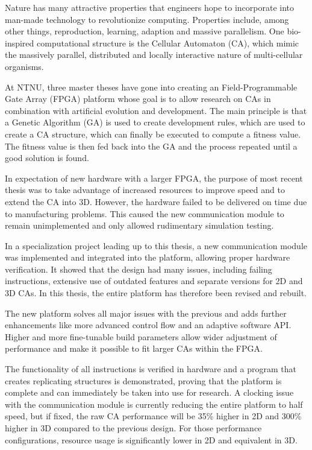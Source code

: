 Nature has many attractive properties that engineers hope to incorporate into man-made technology to revolutionize computing.
Properties include, among other things, reproduction, learning, adaption and massive parallelism.
One bio-inspired computational structure is the Cellular Automaton (CA), which mimic the massively parallel, distributed and locally interactive nature of multi-cellular organisms.

At NTNU, three master theses have gone into creating an Field-Programmable Gate Array (FPGA) platform whose goal is to allow research on CAs in combination with artificial evolution and development.
The main principle is that a Genetic Algorithm (GA) is used to create development rules, which are used to create a CA structure, which can finally be executed to compute a fitness value.
The fitness value is then fed back into the GA and the process repeated until a good solution is found.

In expectation of new hardware with a larger FPGA, the purpose of most recent thesis was to take advantage of increased resources to improve speed and to extend the CA into 3D.
However, the hardware failed to be delivered on time due to manufacturing problems.
This caused the new communication module to remain unimplemented and only allowed rudimentary simulation testing.

In a specialization project leading up to this thesis, a new communication module was implemented and integrated into the platform, allowing proper hardware verification.
It showed that the design had many issues, including failing instructions, extensive use of outdated features and separate versions for 2D and 3D CAs.
In this thesis, the entire platform has therefore been revised and rebuilt.

The new platform solves all major issues with the previous and adds further enhancements like more advanced control flow and an adaptive software API.
Higher and more fine-tunable build parameters allow wider adjustment of performance and make it possible to fit larger CAs within the FPGA.

The functionality of all instructions is verified in hardware and a program that creates replicating structures is demonstrated, proving that the platform is complete and can immediately be taken into use for research.
A clocking issue with the communication module is currently reducing the entire platform to half speed, but if fixed, the raw CA performance will be 35\% higher in 2D and 300\% higher in 3D compared to the previous design.
For those performance configurations, resource usage is significantly lower in 2D and equivalent in 3D.
